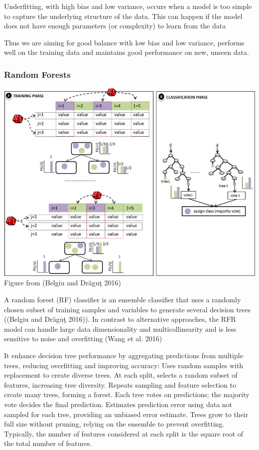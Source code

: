 \documentclass[
  letterpaper,
  DIV=11,
  numbers=noendperiod]{scrreprt}
\begin{document}
Underfitting, with high bias and low variance, occurs when a model is
too simple to capture the underlying structure of the data. This can
happen if the model does not have enough parameters (or complexity) to
learn from the data

Thus we are aiming for good balance with low bias and low variance,
performs well on the training data and maintains good performance on
new, unseen data.

\subsubsection{Random Forests}\label{random-forests}

\includegraphics{RF.png} Figure from (Belgiu and Drăguţ 2016)

A random forest (RF) classifier is an ensemble classifier that uses a
randomly chosen subset of training samples and variables to generate
several decision trees ((Belgiu and Drăguţ 2016)). In contrast to
alternative approaches, the RFR model can handle large data
dimensionality and multicollinearity and is less sensitive to noise and
overfitting (Wang et al. 2016)

It enhance decision tree performance by aggregating predictions from
multiple trees, reducing overfitting and improving accuracy: Uses random
samples with replacement to create diverse trees. At each split, selects
a random subset of features, increasing tree diversity. Repeats sampling
and feature selection to create many trees, forming a forest. Each tree
votes on predictions; the majority vote decides the final prediction.
Estimates prediction error using data not sampled for each tree,
providing an unbiased error estimate. Trees grow to their full size
without pruning, relying on the ensemble to prevent overfitting.
Typically, the number of features considered at each split is the square
root of the total number of features.
\end{document}
